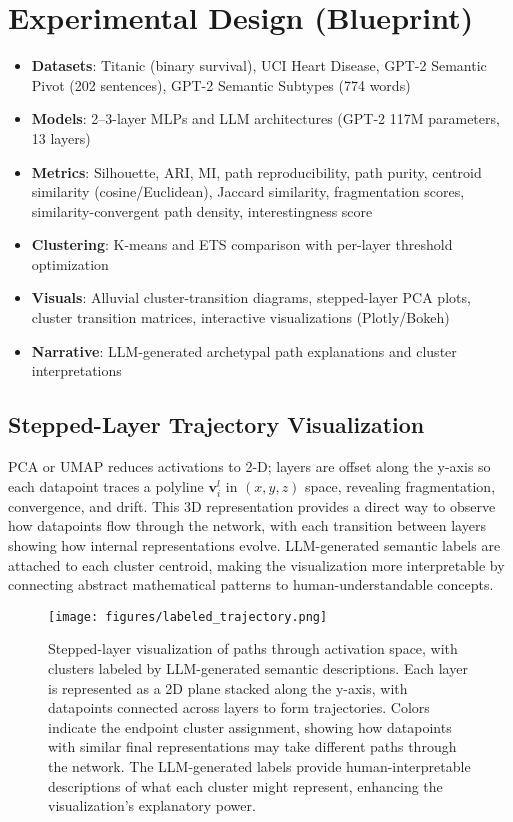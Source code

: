 \section{Experimental Design (Blueprint)}

\begin{itemize}
    \item \textbf{Datasets}: Titanic (binary survival), UCI Heart Disease, GPT-2 Semantic Pivot (202 sentences), GPT-2 Semantic Subtypes (774 words)
    \item \textbf{Models}: 2--3-layer MLPs and LLM architectures (GPT-2 117M parameters, 13 layers)
    \item \textbf{Metrics}: Silhouette, ARI, MI, path reproducibility, path purity, centroid similarity (cosine/Euclidean), Jaccard similarity, fragmentation scores, similarity-convergent path density, interestingness score
    \item \textbf{Clustering}: K-means and ETS comparison with per-layer threshold optimization
    \item \textbf{Visuals}: Alluvial cluster-transition diagrams, stepped-layer PCA plots, cluster transition matrices, interactive visualizations (Plotly/Bokeh)
    \item \textbf{Narrative}: LLM-generated archetypal path explanations and cluster interpretations
\end{itemize}

\subsection{Stepped-Layer Trajectory Visualization}

PCA or UMAP reduces activations to 2-D; layers are offset along the y-axis so each datapoint traces a polyline $\mathbf{v}_i^l$ in $(x,y,z)$ space, revealing fragmentation, convergence, and drift. This 3D representation provides a direct way to observe how datapoints flow through the network, with each transition between layers showing how internal representations evolve. LLM-generated semantic labels are attached to each cluster centroid, making the visualization more interpretable by connecting abstract mathematical patterns to human-understandable concepts.

\begin{figure}[ht]
    \centering
    \texttt{[image: figures/labeled\_trajectory.png]}
    \caption{Stepped-layer visualization of paths through activation space, with clusters labeled by LLM-generated semantic descriptions. Each layer is represented as a 2D plane stacked along the y-axis, with datapoints connected across layers to form trajectories. Colors indicate the endpoint cluster assignment, showing how datapoints with similar final representations may take different paths through the network. The LLM-generated labels provide human-interpretable descriptions of what each cluster might represent, enhancing the visualization's explanatory power.}
    \label{fig:labeled_trajectory}
\end{figure}

